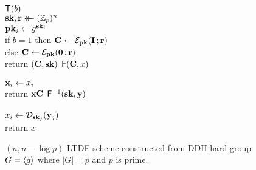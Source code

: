 \begin{figure}
  \newcommand{\vecpk}{\vecfont{pk}}
  \newcommand{\vecsk}{\vecfont{sk}}
  \newcommand{\veccoins}{\vecfont{r}}
  {
    \underline{$\mathsf{T}(b)$}\\[2pt]
      $\vecsk, \veccoins \getsr (\Z_p)^n$\\
       $\vecpk_i \gets g^{\vecsk_i}$\\
      if $b=1$ then $\matc \gets \enc_\vecpk(\matid \,; \veccoins)$\\
      else $\matc \gets \enc_\vecpk(\matzero \,; \veccoins)$\\
      return $(\matc, \vecsk)$
  }
  {
    \underline{$\mathsf{F}(\mathbf{C}, x)$}\\[2pt]
      \\
      \tab $\mathbf{x}_i \gets x_i$\\
      return $\mathbf{x} \mathbf{C}$
  }
  {
    \underline{$\losfinv(\vecsk, \vecy)$}\\[2pt]
    \\
    \tab $x_i \gets \dec_{\vecsk_j}(\vecy_j)$\\
    return $x$
  }
  \caption{$(n,n-\log p)$-LTDF scheme constructed from DDH-hard group $G =
  \langle g \rangle$ where $|G| = p$ and $p$ is prime.}
  \label{fig-ddh-ltdf}
\end{figure}

